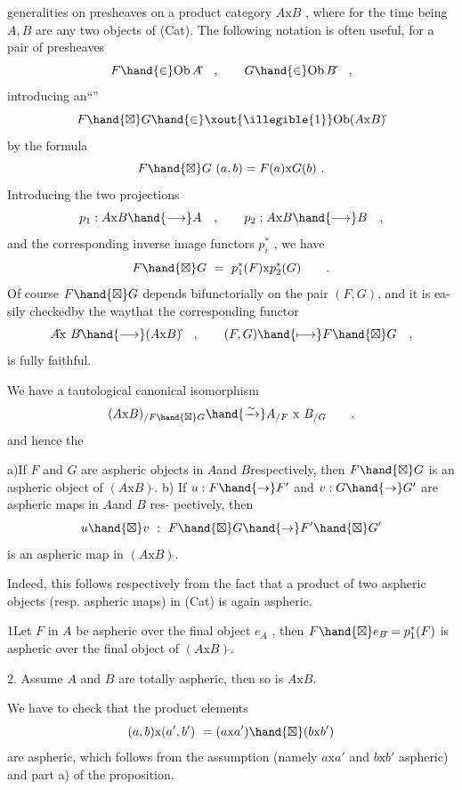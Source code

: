 generalities on presheaves on a product category $A\mathrm{x}B$ , where for the
time being $A,B$ are any two objects of (Cat). The following notation
is often useful, for a pair of presheaves
\[ F\hand{\in} \mathrm{Ob}\, A\hat{} \quad , \qquad G\hand{\in} \mathrm{Ob}\, B\hat{} \quad , \]
introducing an``\hand{\uline{\textcolor{black}{external product}}}''
\[ F\hand{\boxtimes} G \hand{\in} \xout{\illegible{1}}\mathrm{Ob}(A\mathrm{x}B)\hat{} \]
by the formula
\[ F\hand{\boxtimes} G\ (a,b) = F(a)\mathrm{x}G(b) \ . \]
Introducing the two projections
\[ p_1 : A\mathrm{x}B \hand{\longrightarrow} A \quad , \qquad p_2 : A\mathrm{x}B \hand{\longrightarrow} B \quad , \]
and the corresponding inverse image functors $p_i^{*}$ , we have
\[ F\hand{\boxtimes} G \ = \ p_1^{*}(F)\mathrm{x}p_2^{*}(G) \qquad . \]
Of course $F\hand{\boxtimes} G$ depends bifunctorially on the pair $(F,G)$, and it is ea-%
sily checked\hand{,}by the way\hand{,}that the corresponding functor
\[ A\hat{}\mathrm{x}\ B\hat{} \hand{\longrightarrow} (A\mathrm{x}B)\hat{} \quad , \qquad (F,G)\hand{\longmapsto} F\hand{\boxtimes} G \quad , \]
is fully faithful.

We have a tautological canonical isomorphism
\[ (A\mathrm{x}B)_{/F\hand{\boxtimes} G} \hand{\xrightarrow{\sim}} A_{/F}\ \mathrm{x}\ B_{/G} \qquad , \]
and hence the

\hand{\uline{\textcolor{black}{Proposition}}} a)If $F$ and $G$ are aspheric objects in $A\hat{}$and $B\hat{}$\hand{/}respectively,
then $F\hand{\boxtimes} G$ is an aspheric object of $(A\mathrm{x}B)\hat{}$.
b) If $u : F\hand{\rightarrow} F'$ and $v : G\hand{\rightarrow} G'$ are aspheric maps in $A\hat{}$and $B\hat{}$ res-%
pectively, then
\[ u\hand{\boxtimes} v \ : \ F\hand{\boxtimes} G \hand{\rightarrow} F'\hand{\boxtimes} G' \]
is an aspheric map in $(A\mathrm{x}B)\hat{}$.

Indeed, this follows respectively from the fact that a product of
two aspheric objects (resp. aspheric maps) in (Cat) is again aspheric.

\hand{\uline{\textcolor{black}{Corollary}}} 1Let $F$ in $A\hat{}$ be aspheric over the final object $e_{A\hat{}}$ , then
$F\hand{\boxtimes} e_{B\hat{}} = p_1^{*}(F)$ is aspheric over the final object of $(A\mathrm{x}B)\hat{}$.

\hand{\uline{\textcolor{black}{Corollary}}} 2. Assume $A$ and $B$ are totally aspheric, then so is $A\mathrm{x}B$.

We have to check that the product elements
\[ (a,b)\mathrm{x}(a',b') \ = (a\mathrm{x}a')\hand{\boxtimes}(b\mathrm{x}b') \]
are aspheric, which follows from the assumption (namely $a\mathrm{x}a'$ and $b\mathrm{x}b'$
aspheric) and part a) of the proposition.

